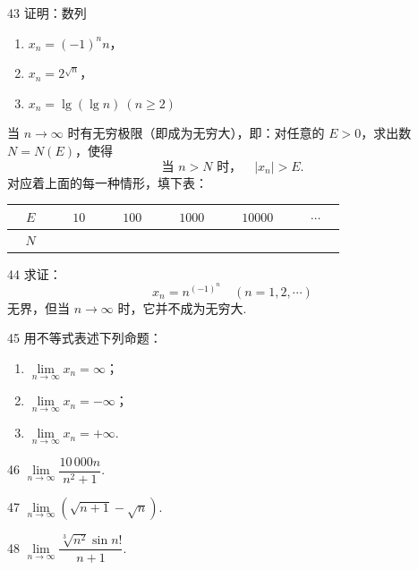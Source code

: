 \begin{prob}[L]{43}
证明：数列
\begin{enumerate}[label=(\alph*), itemsep=2pt, topsep=3pt]
\item $x_n = (-1)^n n$，
\item $x_n = 2^{\sqrt{n}}$，
\item $x_n = \lg(\lg n)\ (n \geqslant 2)$
\end{enumerate}
当 $n \to \infty$ 时有无穷极限（即成为无穷大），即：对任意的 $E > 0$，求出数 $N = N(E)$，使得
\[
\text{当 } n > N \text{ 时，} \quad |x_n| > E.
\]
对应着上面的每一种情形，填下表：
\begin{center}
\begin{tabular}{c|c|c|c|c|c}
\hline
$\quad E \quad$ & $\quad 10 \quad$ & $\quad 100 \quad$ & $\quad 1000 \quad$ & $\quad 10000 \quad$ & $\quad \cdots \quad$ \\
\hline
$N$ & & & & & \\
\hline
\end{tabular}
\end{center}
\end{prob}

\begin{prob}[M]{44}
求证：
\[
x_n = n^{(-1)^n} \quad (n=1,2,\cdots)
\]
无界，但当 $n \to \infty$ 时，它并不成为无穷大.
\end{prob}

\begin{prob}[L]{45}
用不等式表述下列命题：
\begin{enumerate}[label=(\alph*), itemsep=2pt, topsep=3pt]
\item $\lim\limits_{n\to\infty} x_n = \infty$；
\item $\lim\limits_{n\to\infty} x_n = -\infty$；
\item $\lim\limits_{n\to\infty} x_n = +\infty$.
\end{enumerate}
\end{prob}


\begin{prob}[S]{46}
$\lim\limits_{n\to\infty} \dfrac{10\,000n}{n^2+1}$.
\end{prob}

\begin{prob}[S]{47}
$\lim\limits_{n\to\infty} (\sqrt{n+1} - \sqrt{n})$.
\end{prob}

\begin{prob}[S]{48}
$\lim\limits_{n\to\infty} \dfrac{\sqrt[3]{n^2}\sin n!}{n+1}$.
\end{prob}


